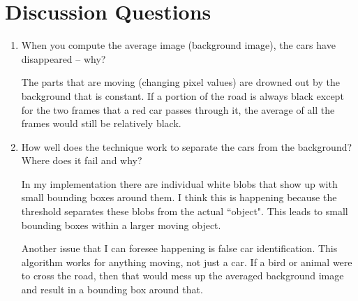 \documentclass[11pt]{article}
\begin{document}
\section{Discussion Questions}

\begin{enumerate}

	\item When you compute the average image (background image), the cars have disappeared -- why?

		The parts that are moving (changing pixel values) are drowned out by the background that is constant.
		If a portion of the road is always black except for the two frames that a red car passes through it, the average of all the frames would still be relatively black.

	\item How well does the technique work to separate the cars from the background? Where does it fail and why?

		In my implementation there are individual white blobs that show up with small bounding boxes around them.
		I think this is happening because the threshold separates these blobs from the actual ``object".
		This leads to small bounding boxes within a larger moving object.

		Another issue that I can foresee happening is false car identification.
		This algorithm works for anything moving, not just a car.
		If a bird or animal were to cross the road, then that would mess up the averaged background image and result in a bounding box around that.
\end{enumerate}
\end{document}
